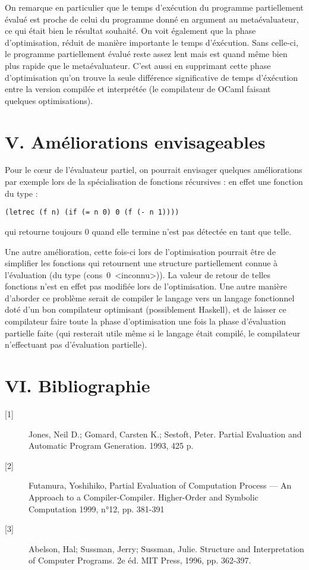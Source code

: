 \documentclass[a4paper,11pt]{article}
\newcommand{\code}[1]{{\fontfamily{pcr}\selectfont #1}}
\begin{document}
On remarque en particulier que le temps d'exécution du programme
partiellement évalué est proche de celui du programme donné en
argument au metaévaluateur, ce qui était bien le résultat
souhaité. On voit également que la phase d'optimisation, réduit de
manière importante le temps d'éxécution. Sans celle-ci, le programme
partiellement évalué reste assez lent mais est quand même bien plus
rapide que le metaévaluateur.  C'est aussi en supprimant cette phase
d'optimisation qu'on trouve la seule différence significative de temps
d'éxécution entre la version compilée et interprétée (le compilateur
de OCaml faisant quelques optimisations).

\section{V. Améliorations envisageables}

Pour le cœur de l'évaluateur partiel, on pourrait envisager quelques
améliorations par exemple lors de la spécialisation de fonctions
récursives : en effet une fonction du type :

\begin{lstlisting}
(letrec (f n) (if (= n 0) 0 (f (- n 1))))
\end{lstlisting}

qui retourne toujours 0 quand elle termine n'est pas détectée en tant
que telle.

Une autre amélioration, cette fois-ci lors de l'optimisation
pourrait être de simplifier les fonctions qui retournent une structure
partiellement connue à l'évaluation (du type \code{(cons~0~<inconnu>)}). La
valeur de retour de telles fonctions n'est en effet pas modifiée lors
de l'optimisation. Une autre manière d'aborder ce problème serait de
compiler le langage vers un langage fonctionnel doté d'un bon compilateur
optimisant (possiblement Haskell), et de laisser ce compilateur faire
toute la phase d'optimisation une fois la phase d'évaluation partielle faite
(qui resterait utile même si le langage était compilé, le compilateur
n'effectuant pas d'évaluation partielle).

\section{VI. Bibliographie}

\begin{description}

\item[{[1]}] Jones, Neil D.; Gomard, Carsten K.; Sestoft, Peter. Partial Evaluation and Automatic Program Generation. 1993, 425 p.
\item[{[2]}] Futamura, Yoshihiko, Partial Evaluation of Computation Process — An Approach to a Compiler-Compiler. Higher-Order and Symbolic Computation 1999, n°12, pp. 381-391
\item[{[3]}] Abelson, Hal; Sussman, Jerry; Sussman, Julie. Structure and Interpretation of Computer Programs. 2e éd. MIT Press, 1996, pp. 362-397.

\end{description}
\end{document}
